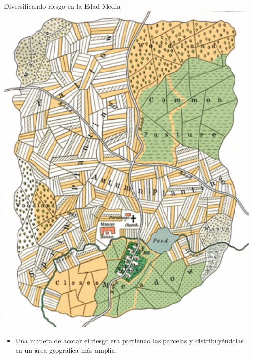 \documentclass{beamer}
\begin{document}
\begin{frame}{Diversificando riesgo en la Edad Media}
    \centering
    \includegraphics[scale=0.4]{../PastedGraphic-1.pdf}
    \begin{itemize}
        \item Una manera de acotar el riesgo era partiendo las parcelas y distribuyéndolas en un área geográfica más amplia. 
    \end{itemize}
\end{frame}
\end{document}
